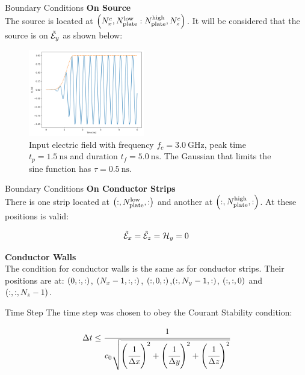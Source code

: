 \documentclass[aspectratio=169]{beamer}
\begin{document}
\begin{frame}{Boundary Conditions}
  \textbf{On Source} \\
  The source is located at $\pare{N_x^c, N_{\textnormal{plate}}^{\textnormal{low}} : N_{\textnormal{plate}}^{\textnormal{high}}, N_z^c}$. It will be considered that the source is on $\tilde{\mathcal{E}}_y$ as shown below: 

  \begin{figure}[H]
      \centering
      \includegraphics[width=0.45\textwidth]{../contents/input_source.png}
      \caption{Input electric field with frequency $f_c = \SI{3.0}{\giga\hertz}$, peak time $t_p = \SI{1.5}{\nano\second}$ and duration $t_f = \SI{5.0}{\nano\second}$. The Gaussian that limits the sine function has $\tau = \SI{0.5}{\nano\second}$.}
  \end{figure}
\end{frame}

\begin{frame}{Boundary Conditions}
  \textbf{On Conductor Strips} \\

  There is one strip located at $\pare{:, N_{\textnormal{plate}}^{\textnormal{low}}, :}$ and another at $\pare{:, N_{\textnormal{plate}}^{\textnormal{high}}, :}$. At these positions is valid:

  \begin{align}
      \tilde{\mathcal{E}}_x = \tilde{\mathcal{E}}_z = \mathcal{H}_y = 0
  \end{align}

  \textbf{Conductor Walls} \\

  The condition for conductor walls is the same as for conductor strips. Their positions are at: $\pare{0, :, :}$, $\pare{N_x-1, :, :}$, $\pare{:, 0, :}$,$\pare{:, N_y-1, :}$, $\pare{:, :, 0}$ and $\pare{:, :, N_z-1}$.
\end{frame}

\begin{frame}{Time Step}
  The time step was chosen to obey the Courant Stability condition:

  \begin{equation}
      \dt \leq \cfrac{1}{c_0\sqrt{\pare{\cfrac{1}{\dx}}^2 + \pare{\cfrac{1}{\dy}}^2 + \pare{\cfrac{1}{\dz}}^2}}
  \end{equation}
\end{frame}
\end{document}
